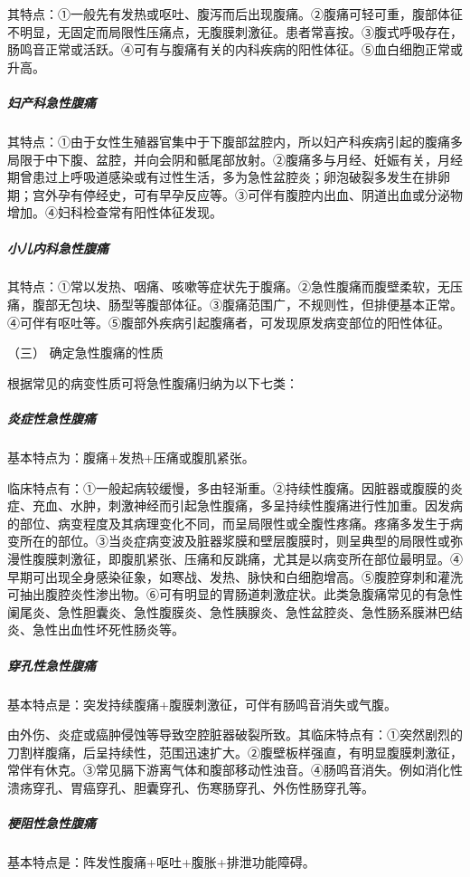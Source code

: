 其特点：①一般先有发热或呕吐、腹泻而后出现腹痛。②腹痛可轻可重，腹部体征不明显，无固定而局限性压痛点，无腹膜刺激征。患者常喜按。③腹式呼吸存在，肠鸣音正常或活跃。④可有与腹痛有关的内科疾病的阳性体征。⑤血白细胞正常或升高。

\subparagraph{妇产科急性腹痛}

其特点：①由于女性生殖器官集中于下腹部盆腔内，所以妇产科疾病引起的腹痛多局限于中下腹、盆腔，并向会阴和骶尾部放射。②腹痛多与月经、妊娠有关，月经期曾患过上呼吸道感染或有过性生活，多为急性盆腔炎；卵泡破裂多发生在排卵期；宫外孕有停经史，可有早孕反应等。③可伴有腹腔内出血、阴道出血或分泌物增加。④妇科检查常有阳性体征发现。

\subparagraph{小儿内科急性腹痛}

其特点：①常以发热、咽痛、咳嗽等症状先于腹痛。②急性腹痛而腹壁柔软，无压痛，腹部无包块、肠型等腹部体征。③腹痛范围广，不规则性，但排便基本正常。④可伴有呕吐等。⑤腹部外疾病引起腹痛者，可发现原发病变部位的阳性体征。

\hypertarget{text00026.htmlux5cux23CHP1-10-2-3-3}{}
（三） 确定急性腹痛的性质

根据常见的病变性质可将急性腹痛归纳为以下七类：

\subparagraph{炎症性急性腹痛}

基本特点为：腹痛+发热+压痛或腹肌紧张。

临床特点有：①一般起病较缓慢，多由轻渐重。②持续性腹痛。因脏器或腹膜的炎症、充血、水肿，刺激神经而引起急性腹痛，多呈持续性腹痛进行性加重。因发病的部位、病变程度及其病理变化不同，而呈局限性或全腹性疼痛。疼痛多发生于病变所在的部位。③当炎症病变波及脏器浆膜和壁层腹膜时，则呈典型的局限性或弥漫性腹膜刺激征，即腹肌紧张、压痛和反跳痛，尤其是以病变所在部位最明显。④早期可出现全身感染征象，如寒战、发热、脉快和白细胞增高。⑤腹腔穿刺和灌洗可抽出腹腔炎性渗出物。⑥可有明显的胃肠道刺激症状。此类急腹痛常见的有急性阑尾炎、急性胆囊炎、急性腹膜炎、急性胰腺炎、急性盆腔炎、急性肠系膜淋巴结炎、急性出血性坏死性肠炎等。

\subparagraph{穿孔性急性腹痛}

基本特点是：突发持续腹痛+腹膜刺激征，可伴有肠鸣音消失或气腹。

由外伤、炎症或癌肿侵蚀等导致空腔脏器破裂所致。其临床特点有：①突然剧烈的刀割样腹痛，后呈持续性，范围迅速扩大。②腹壁板样强直，有明显腹膜刺激征，常伴有休克。③常见膈下游离气体和腹部移动性浊音。④肠鸣音消失。例如消化性溃疡穿孔、胃癌穿孔、胆囊穿孔、伤寒肠穿孔、外伤性肠穿孔等。

\subparagraph{梗阻性急性腹痛}

基本特点是：阵发性腹痛+呕吐+腹胀+排泄功能障碍。

